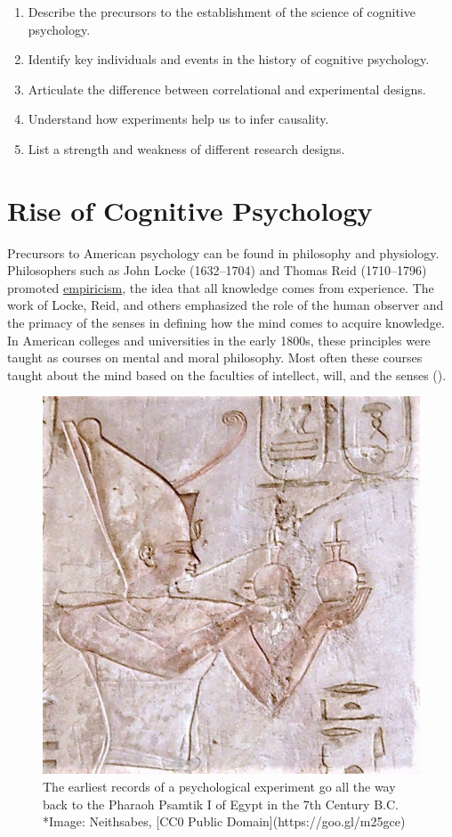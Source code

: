 \documentclass[
]{krantz}
\providecommand{\tightlist}{%
  \setlength{\itemsep}{0pt}\setlength{\parskip}{0pt}}
\begin{document}
\begin{enumerate}
\def\labelenumi{\arabic{enumi}.}
\tightlist
\item
  Describe the precursors to the establishment of the science of cognitive psychology.
\item
  Identify key individuals and events in the history of cognitive psychology.
\item
  Articulate the difference between correlational and experimental designs.
\item
  Understand how experiments help us to infer causality.
\item
  List a strength and weakness of different research designs.
\end{enumerate}

\section{Rise of Cognitive Psychology}\label{rise-of-cognitive-psychology}

Precursors to American psychology can be found in philosophy and physiology. Philosophers such as John Locke (1632--1704) and Thomas Reid (1710--1796) promoted \hyperref[empiricism]{empiricism}, the idea that all knowledge comes from experience. The work of Locke, Reid, and others emphasized the role of the human observer and the primacy of the senses in defining how the mind comes to acquire knowledge. In American colleges and universities in the early 1800s, these principles were taught as courses on mental and moral philosophy. Most often these courses taught about the mind based on the faculties of intellect, will, and the senses ().

\begin{figure}

{\centering \includegraphics[width=0.4\linewidth]{images/ch1/pharoah} 

}

\caption{The earliest records of a psychological experiment go all the way back to the Pharaoh Psamtik I of Egypt in the 7th Century B.C. *Image: Neithsabes, [CC0 Public Domain](https://goo.gl/m25gce)}\label{fig:pharoah}
\end{figure}
\end{document}
